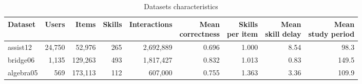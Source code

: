 \begin{table}
\centering
\begin{tabular}{@{}lrrrrrrrr@{}}
\toprule
Dataset & Users & Items & Skills & Interactions & \makecell[cl]{Mean \\ correctness} & 
\makecell[cl]{Skills \\ per item} &
\makecell[cl]{Mean \\ skill delay} &
\makecell[cl]{Mean \\ study period} \\
\midrule
assist12 & 24,750 & 52,976 & 265 & 2,692,889 & 0.696 & 1.000 & 8.54 & 98.3 \\
bridge06 & 1,135 & 129,263 & 493 & 1,817,427 & 0.832 & 1.013 & 0.83 & 149.5 \\
algebra05 & 569 & 173,113 & 112 & 607,000 & 0.755 & 1.363 & 3.36 & 109.9 \\
\bottomrule
\end{tabular}
\caption{Datasets characteristics}
\label{data_caracs}
\end{table}